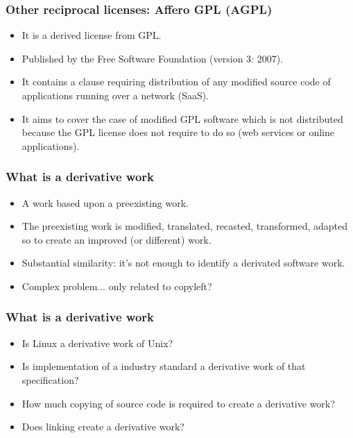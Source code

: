 
\begin{frame}
\frametitle{Other reciprocal licenses: Affero GPL (AGPL)}

\begin{itemize}
\item It is a \alert{derived} license from GPL. 
\item Published by the Free Software Foundation (version 3: 2007).
\item It contains a clause requiring distribution of any modified source code of applications \alert{running over a network} (SaaS).
\item It aims to cover the case of modified GPL software which is not distributed because the GPL license does not require to do so (web services or online applications). 
\end{itemize}
\end{frame}




\begin{frame}
\frametitle{What is a derivative work}

\begin{itemize}
\item A work based upon a preexisting work.
\item The preexisting work is modified, translated, recasted, 
transformed, adapted so to create an improved (or different) work.
\item \alert{Substantial similarity}: it's not enough to identify a derivated software work. 
\item Complex problem... only related to copyleft?
\end{itemize}
\end{frame}


\begin{frame}
\frametitle{What is a derivative work}

\begin{itemize}
\item  Is Linux a derivative work of Unix?
\item Is implementation of a industry standard a derivative work of that specification?
\item How much copying of source code is required to create a derivative work?
\item Does linking create a derivative work?
\end{itemize}
\end{frame}


